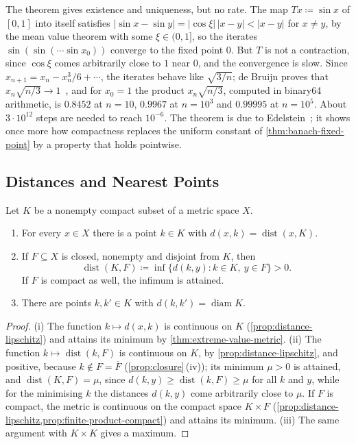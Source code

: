 The theorem gives existence and uniqueness, but no rate. The map $Tx\coloneqq\sin x$ of $[0,1]$ into itself satisfies $|\sin x-\sin y|=|\cos\xi|\,|x-y|<|x-y|$ for $x\ne y$, by the mean value theorem with some $\xi\in(0,1]$, so the iterates $\sin(\sin(\cdots\sin x_0))$ converge to the fixed point $0$. But $T$ is not a contraction, since $\cos\xi$ comes arbitrarily close to $1$ near $0$, and the convergence is slow. Since $x_{n+1}=x_n-x_n^3/6+\cdots$, the iterates behave like $\sqrt{3/n}$; de Bruijn proves that $x_n\sqrt{n/3}\to1$~\cite[Chap.~8]{debruijn1981}, and for $x_0=1$ the product $x_n\sqrt{n/3}$, computed in binary64 arithmetic, is $0.8452$ at $n=10$, $0.9967$ at $n=10^3$ and $0.99995$ at $n=10^5$. About $3\cdot10^{12}$ steps are needed to reach $10^{-6}$. The theorem is due to Edelstein~\cite{edelstein1962}; it shows once more how compactness replaces the uniform constant of \cref{thm:banach-fixed-point} by a property that holds pointwise.

\subsection{Distances and Nearest Points}

\begin{proposition}
\label{prop:compact-distance}
Let $K$ be a nonempty compact subset of a metric space $X$.
\begin{enumerate}
\item For every $x\in X$ there is a point $k\in K$ with $d(x,k)=\operatorname{dist}(x,K)$.
\item If $F\subseteq X$ is closed, nonempty and disjoint from $K$, then
\[
\operatorname{dist}(K,F)\coloneqq\inf\{d(k,y): k\in K,\ y\in F\}>0 .
\]
If $F$ is compact as well, the infimum is attained.
\item There are points $k,k'\in K$ with $d(k,k')=\operatorname{diam}K$.
\end{enumerate}
\end{proposition}

\begin{proof}
(i) The function $k\mapsto d(x,k)$ is continuous on $K$ (\cref{prop:distance-lipschitz}) and attains its minimum by \cref{thm:extreme-value-metric}. (ii) The function $k\mapsto\operatorname{dist}(k,F)$ is continuous on $K$, by \cref{prop:distance-lipschitz}, and positive, because $k\notin F=\overline F$ (\cref{prop:closure}\,(iv)); its minimum $\mu>0$ is attained, and $\operatorname{dist}(K,F)=\mu$, since $d(k,y)\ge\operatorname{dist}(k,F)\ge\mu$ for all $k$ and $y$, while for the minimising $k$ the distances $d(k,y)$ come arbitrarily close to $\mu$. If $F$ is compact, the metric is continuous on the compact space $K\times F$ (\cref{prop:distance-lipschitz,prop:finite-product-compact}) and attains its minimum. (iii) The same argument with $K\times K$ gives a maximum.
\end{proof}

